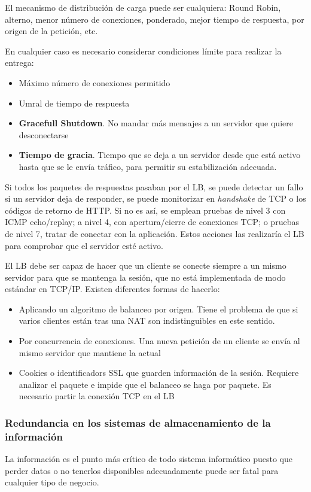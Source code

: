 El mecanismo de distribución de carga puede ser cualquiera: Round Robin, alterno, menor número de conexiones, ponderado, mejor tiempo de respuesta, por origen de la petición, etc.

En cualquier caso es necesario considerar condiciones límite para realizar la entrega:
\begin{itemize}
\item Máximo número de conexiones permitido
\item Umral de tiempo de respuesta
\item \textbf{Gracefull Shutdown}. No mandar más mensajes a un servidor que quiere desconectarse
\item \textbf{Tiempo de gracia}. Tiempo que se deja a un servidor desde que está activo hasta que se le envía tráfico, para permitir su estabilización adecuada.
\end{itemize}

Si todos los paquetes de respuestas pasaban por el LB, se puede detectar un fallo si un servidor deja de responder, se puede monitorizar en \textit{handshake} de TCP o los códigos de retorno de HTTP. Si no es así, se emplean pruebas de nivel 3 con ICMP echo/replay; a nivel 4, con apertura/cierre de conexiones TCP; o pruebas de nivel 7, tratar de conectar con la aplicación. Estos acciones las realizaría el LB para comprobar que el servidor esté activo.

El LB debe ser capaz de hacer que un cliente se conecte siempre a un mismo servidor para que se mantenga la sesión, que no está implementada de modo estándar en TCP/IP. Existen diferentes formas de hacerlo:
\begin{itemize}
\item Aplicando un algoritmo de balanceo por origen. Tiene el problema de que si varios clientes están tras una NAT son indistinguibles en este sentido.
\item Por concurrencia de conexiones. Una nueva petición de un cliente se envía al mismo servidor que mantiene la actual
\item Cookies o identificadors SSL que guarden información de la sesión. Requiere analizar el paquete e impide que el balanceo se haga por paquete. Es necesario partir la conexión TCP en el LB
\end{itemize}

\subsubsection{Redundancia en los sistemas de almacenamiento de la información}
La información es el punto más crítico de todo sistema informático puesto que perder datos o no tenerlos disponibles adecuadamente puede ser fatal para cualquier tipo de negocio.

